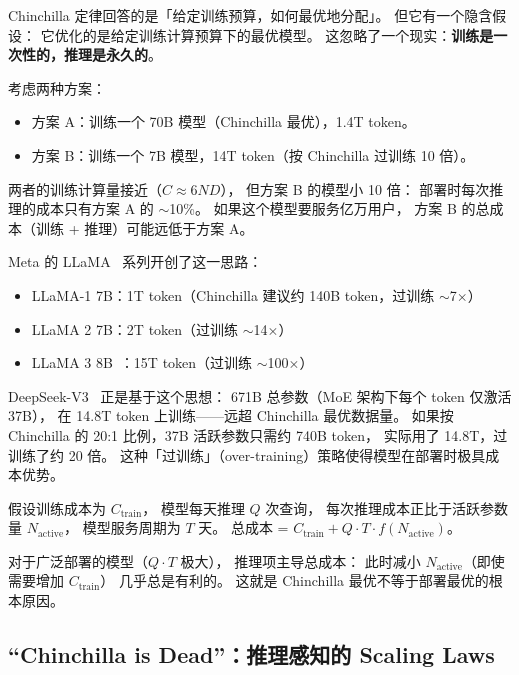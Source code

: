 Chinchilla 定律回答的是「给定训练预算，如何最优地分配」。
但它有一个隐含假设：
它优化的是给定训练计算预算下的最优模型。
这忽略了一个现实：\textbf{训练是一次性的，推理是永久的}。

考虑两种方案：
\begin{itemize}[noitemsep]
  \item 方案 A：训练一个 70B 模型（Chinchilla 最优），1.4T token。
  \item 方案 B：训练一个 7B 模型，14T token（按 Chinchilla 过训练 10 倍）。
\end{itemize}
两者的训练计算量接近（$C \approx 6ND$），
但方案 B 的模型小 10 倍：
部署时每次推理的成本只有方案 A 的 $\sim$10\%。
如果这个模型要服务亿万用户，
方案 B 的总成本（训练 + 推理）可能远低于方案 A。

Meta 的 LLaMA~\cite{touvron2023llama} 系列开创了这一思路：
\begin{itemize}[noitemsep]
  \item LLaMA-1 7B：1T token（Chinchilla 建议约 140B token，过训练 $\sim$7$\times$）
  \item LLaMA 2 7B：2T token（过训练 $\sim$14$\times$）
  \item LLaMA 3 8B~\cite{dubey2024llama3}：15T token（过训练 $\sim$100$\times$）
\end{itemize}

DeepSeek-V3~\cite{deepseekv3} 正是基于这个思想：
671B 总参数（MoE 架构下每个 token 仅激活 37B），
在 14.8T token 上训练——远超 Chinchilla 最优数据量。
如果按 Chinchilla 的 20:1 比例，37B 活跃参数只需约 740B token，
实际用了 14.8T，过训练了约 20 倍。
这种「过训练」（over-training）策略使得模型在部署时极具成本优势。

\begin{corebox}
假设训练成本为 $C_{\mathrm{train}}$，
模型每天推理 $Q$ 次查询，
每次推理成本正比于活跃参数量 $N_{\mathrm{active}}$，
模型服务周期为 $T$ 天。
总成本 =
$C_{\mathrm{train}} + Q \cdot T \cdot f(N_{\mathrm{active}})$。

对于广泛部署的模型（$Q \cdot T$ 极大），
推理项主导总成本：
此时减小 $N_{\mathrm{active}}$（即使需要增加 $C_{\mathrm{train}}$）
几乎总是有利的。
这就是 Chinchilla 最优不等于部署最优的根本原因。
\end{corebox}

\subsection{“Chinchilla is Dead”：推理感知的 Scaling Laws}
\label{sec:inference-aware-scaling}

